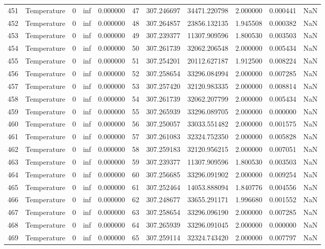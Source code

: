 \begin{tabular}{llrrrrrrrrr}
451 & Temperature & 0 & inf & 0.000000 & 47 & 307.246697 & 34471.220798 & 2.000000 & 0.000441 & NaN \\
452 & Temperature & 0 & inf & 0.000000 & 48 & 307.264857 & 23856.132135 & 1.945508 & 0.000382 & NaN \\
453 & Temperature & 0 & inf & 0.000000 & 49 & 307.239377 & 11307.909596 & 1.800530 & 0.003503 & NaN \\
454 & Temperature & 0 & inf & 0.000000 & 50 & 307.261739 & 32062.206548 & 2.000000 & 0.005434 & NaN \\
455 & Temperature & 0 & inf & 0.000000 & 51 & 307.254201 & 20112.627187 & 1.912500 & 0.008224 & NaN \\
456 & Temperature & 0 & inf & 0.000000 & 52 & 307.258654 & 33296.084994 & 2.000000 & 0.007285 & NaN \\
457 & Temperature & 0 & inf & 0.000000 & 53 & 307.257420 & 32120.983335 & 2.000000 & 0.008814 & NaN \\
458 & Temperature & 0 & inf & 0.000000 & 54 & 307.261739 & 32062.207799 & 2.000000 & 0.005434 & NaN \\
459 & Temperature & 0 & inf & 0.000000 & 55 & 307.265939 & 33296.089705 & 2.000000 & 0.000000 & NaN \\
460 & Temperature & 0 & inf & 0.000000 & 56 & 307.250057 & 33033.551482 & 2.000000 & 0.001575 & NaN \\
461 & Temperature & 0 & inf & 0.000000 & 57 & 307.261083 & 32324.752350 & 2.000000 & 0.005828 & NaN \\
462 & Temperature & 0 & inf & 0.000000 & 58 & 307.259183 & 32120.956215 & 2.000000 & 0.007051 & NaN \\
463 & Temperature & 0 & inf & 0.000000 & 59 & 307.239377 & 11307.909596 & 1.800530 & 0.003503 & NaN \\
464 & Temperature & 0 & inf & 0.000000 & 60 & 307.256685 & 33296.091902 & 2.000000 & 0.009254 & NaN \\
465 & Temperature & 0 & inf & 0.000000 & 61 & 307.252464 & 14053.888094 & 1.840776 & 0.004556 & NaN \\
466 & Temperature & 0 & inf & 0.000000 & 62 & 307.248677 & 33655.291171 & 1.996680 & 0.001552 & NaN \\
467 & Temperature & 0 & inf & 0.000000 & 63 & 307.258654 & 33296.096190 & 2.000000 & 0.007285 & NaN \\
468 & Temperature & 0 & inf & 0.000000 & 64 & 307.265939 & 33296.091045 & 2.000000 & 0.000000 & NaN \\
469 & Temperature & 0 & inf & 0.000000 & 65 & 307.259114 & 32324.743420 & 2.000000 & 0.007797 & NaN \\

\end{tabular}

